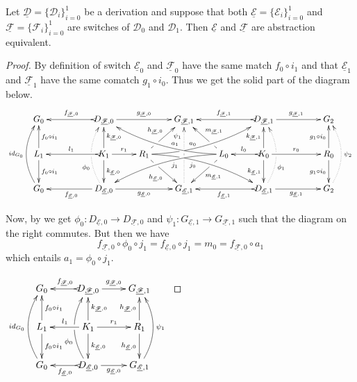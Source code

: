 \documentclass[a4paper,UKenglish,cleveref,pdftex,thm-restate,numberwithinsect,anonymous]{lipics}
\newcommand{\id}[1]{\mathsf{id}_{#1}}
\newcommand{\dder}[1]{\mathscr{#1}}
\newcommand{\der}[1]{\underline{\dder{#1}}}
\begin{document}
\begin{lemma}
  \label{thm:switch_uni}
  Let $\der{D}=\{\dder{D}_{i}\}_{i=0}^1$ be a derivation and suppose
  that both $\der{E}=\{\dder{E}_i\}_{i=0}^1$ and
  $\der{F}=\{\dder{F}_i\}_{i=0}^1$ are switches of $\dder{D}_0$ and
  $\dder{D}_1$. Then $\der{E}$ and $\der{F}$ are abstraction
  equivalent.
\end{lemma}

\begin{proof}
    By definition of switch $\der{E}_0$ and $\der{F}_0$ have the same match $f_0\circ i_1$ and that $\der{E}_1$ and $\der{F}_1$ have the same comatch $g_1\circ i_0$. Thus we get the solid part of the diagram below.
    \[\xymatrix@C=22pt{G_{0} && \ar@{>->}[ll]_{f_{\der{F},0}} D_{\der{F},0} \ar[rr]^{g_{\der{F},0}}&& G_{\der{F},1} && \ar@{>->}[ll]_{f_{\der{F},1}} D_{\der{F},1} \ar[rr]^{g_{\der{F},1}}&& G_{2}\\L_1 \ar[d]^{f_0\circ i_1} \ar[u]_{f_0\circ i_1}&& K_{1} \ar[d]^{k_{\der{E},0}} \ar[u]_{k_{\der{F},0}}\ar@{>->}[ll]_{l_1} \ar[r]^{r_1} & R_{1} \ar@/^.35cm/[drrr]|(.3)\hole_(.4){j_0} \ar[dr]|(.3)\hole_{h_{\der{E},0}} \ar@/_.35cm/[urrr]|(.3)\hole^(.4){a_0} \ar[ur]|(.3)\hole^{h_{\der{F},0}}& &L_{0} \ar@/_.35cm/[dlll]^(.4){j_1} \ar[dl]|(.3)\hole^{m_{\der{E},1}} \ar@/^.35cm/[ulll]_(.4){a_1} \ar[ul]|(.3)\hole_{m_{\der{F},1}}& K_{0} \ar[d]_{k_{\der{E},1}} \ar[u]^{k_{\der{F},1}}\ar@{>->}[l]_{l_{0}} \ar[rr]^{r_0} && R_{0} \ar[d]_{g_1\circ i_0} \ar[u]^{g_1\circ i_0}\\ \ar@/^.5cm/[uu]^{\id{G_0}} G_{0} && \ar[ll]^{f_{\der{E},0}} D_{\der{E},0} \ar@{.>}@/^.5cm/[uu]^(.33){\phi_{0}}|\hole \ar[rr]_{g_{\der{E},0}}&& G_{\der{E},1} \ar@{.>}[uu]^(.76){\psi_1}|(.45)\hole |(.55)\hole&& \ar@{>->}[ll]^{f_{\der{E},1}} D_{\der{E},1} \ar@{.>}@/_.5cm/[uu]_(.33){\phi_{1}}|\hole\ar[rr]_{g_{\der{E},1}}&& G_{2}\ar@{.>}@/_.5cm/[uu]_{\psi_2}}\]
    
    \parbox{7cm}{\hspace{15pt}Now, by  we get $\phi_0\colon D_{\der{E},0}\to D_{\der{F},0}$ and $\psi_1 \colon G_{\der{E},1}\to G_{\der{F},1}$ such that the diagram on the right commutes. But then we have
    	\[
    	f_{\der{F},0}\circ \phi_0\circ j_1=f_{\der{E},0} \circ j_1=m_0=f_{\der{F},0}\circ a_1\]
    	which entails $a_1= \phi_0\circ j_1$.}
\parbox{4cm} {$\xymatrix{G_{0} & \ar@{>->}[l]_{f_{\der{F},0}} D_{\der{F},0} \ar[r]^{g_{\der{F},0}}& G_{\der{F},1} \\L_1 \ar[d]^{f_0\circ i_1} \ar[u]_{f_0\circ i_1}& K_{1} \ar[d]^{k_{\der{E},0}} \ar[u]_{k_{\der{F},0}}\ar[l]_{l_1} \ar[r]^{r_1} & R_{1}  \ar[d]_{h_{\der{E},0}}  \ar[u]^{h_{\der{F},0}}\\ \ar@/^.5cm/[uu]^{\id{G_0}} G_{0} & \ar@{>->}[l]^{f_{\der{E},0}} D_{\der{E},0} \ar@/^.5cm/[uu]^(.33){\phi_{0}}|\hole \ar[r]_{g_{\der{E},0}}& G_{\der{E},1} \ar@/_.5cm/[uu]_{\psi_1}}$}
    

\end{proof}
\end{document}
